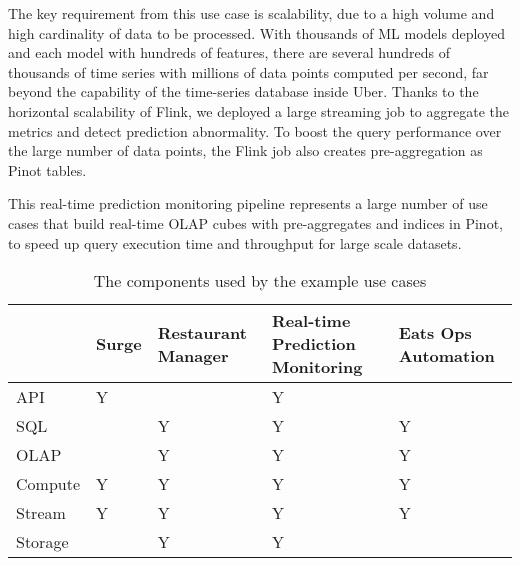 \documentclass[sigconf]{acmart}
\begin{document}
The key requirement from this use case is scalability, due to a high volume and high cardinality of data to be processed. With thousands of ML models deployed and each model with hundreds of features, there are several hundreds of thousands of time series with millions of data points computed per second, far beyond the capability of the time-series database inside Uber. Thanks to the horizontal scalability of Flink, we deployed a large streaming job to aggregate the metrics and detect prediction abnormality. To boost the query performance over the large number of data points, the Flink job also creates pre-aggregation as Pinot tables.

This real-time prediction monitoring pipeline represents a large number of use cases that build real-time OLAP cubes with pre-aggregates and indices in Pinot, to speed up query execution time and throughput for large scale datasets.

\begin{table}
  \caption{The components used by the example use cases}
  \label{tab:components}
  \begin{tabular}{ m{4em} | m{0.8cm} | m{1.3cm} | m{1.6cm} | m{1.3cm} }
    \toprule
    & Surge  & Restaurant Manager  & Real-time Prediction Monitoring & Eats Ops Automation\\
    \midrule
    API  & Y &   & Y &   \\ 
     SQL  &   & Y & Y & Y \\ 
     OLAP &   & Y & Y & Y \\ 
     Compute & Y & Y & Y & Y \\ 
     Stream  & Y & Y & Y & Y \\ 
     Storage  &  & Y & Y &  \\ 
  \bottomrule
\end{tabular}
\end{table}


\end{document}
